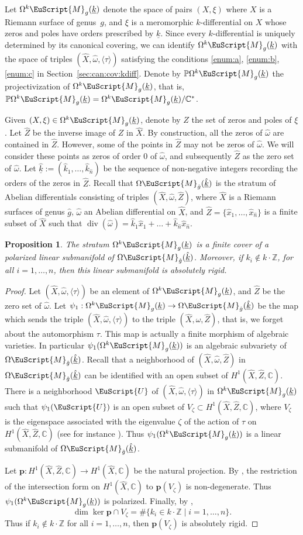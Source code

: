 \documentclass[10pt]{amsart}
\let\mathcal\EuScript
\DeclareMathOperator{\Div}{div}
\theoremstyle{plain}
\newtheorem{Proposition}[Theorem]{Proposition}
\theoremstyle{definition}
\def\C{\mathbb{C}}
\newcommand\Z{\mathbb{Z}}
\newcommand{\Pb}{\mathbb{P}}
\newcommand{\pp}{\boldsymbol{p}}
\newcommand{\Mcal}{\mathcal{M}}
\newcommand{\Ucal}{\mathcal{U}}
\newcommand{\hg}{\hat{g}}
\newcommand{\hn}{\hat{n}}
\newcommand{\hx}{\hat{x}}
\newcommand{\hX}{\hat{X}}
\newcommand{\hZ}{\hat{Z}}
\newcommand{\homg}{\hat{\omega}}
\newcommand{\hk}{\hat{k}}
\let\ul\underline
\newcommand{\Skdiff}{\Omega^k\mathcal{M}_{g}(\ul{k})}
\newcommand{\Sabel}{\Omega\Mcal_{\hat{g}}(\ul{\hat{k}})}
\newcommand{\pSkdiff}{\Pb\Omega^k\mathcal{M}_{g}(\ul{k})}
\begin{document}
Let $\Skdiff$ denote the space of pairs $(X,\xi)$ where $X$ is a Riemann surface of genus~$g$, and $\xi$ is a meromorphic $k$-differential on $X$ whose zeros and poles have orders prescribed by $\ul{k}$.
Since every $k$-differential is uniquely determined by its canonical covering, we can identify $\Skdiff$ with the space of triples $(\hX,\homg,\langle\tau\rangle)$ satisfying the conditions \eqref{enum:a}, \eqref{enum:b}, \eqref{enum:c} in Section~\ref{sec:can:cov:kdiff}.
Denote by $\pSkdiff$ the projectivization of $\Skdiff$, that is, $\pSkdiff=\Skdiff/\C^*$.

Given $(X,\xi)\in \Skdiff$, denote by $Z$ the set of zeros and poles of $\xi$. Let $\hZ$ be the inverse image of $Z$ in $\hX$. By construction, all the zeros of $\homg$ are contained in $\hZ$.
However, some of the points in $\hZ$ may not be zeros of $\homg$. We will consider these points as zeros of order $0$ of $\homg$, and subsequently $\hZ$ as the zero set of $\homg$.
Let $\ul{\hk}:=(\hk_1,\dots,\hk_{\hn})$ be the sequence of non-negative integers recording the orders of the zeros in $\hZ$.
Recall that $\Sabel$ is the stratum of Abelian differentials consisting of triples $(\hX,\homg,\hZ)$, where $\hX$ is a Riemann surfaces of genus $\hg$, $\homg$ an Abelian differential on $\hX$, and $\hZ=\{\hx_1,\dots,\hx_{\hn}\}$ is a finite subset of $\hX$ such that $\Div(\homg)=\hk_1\hx_1+\dots+\hk_{\hn}\hx_{\hn}$.

\begin{Proposition}\label{prop:kdiff:ln:man}
The stratum $\Skdiff$ is a finite cover of a polarized linear submanifold of $\Sabel$. Moreover, if $k_i\not\in k\cdot\Z$, for all $i=1,\dots,n$, then this linear submanifold is absolutely rigid.
\end{Proposition}
\begin{proof}
Let $(\hX,\homg,\langle\tau\rangle)$ be an element of $\Skdiff$, and $\hZ$ be the zero set of $\homg$. Let $\psi_1: \Skdiff \to \Sabel$ be the map which sends the triple $(\hX,\homg,\langle \tau \rangle)$ to the triple $(\hX,\homg,\hZ)$, that is, we forget about the automorphism $\tau$. This map is actually a finite morphism of algebraic varieties. In particular $\psi_1(\Skdiff)$ is an algebraic subvariety of $\Sabel$.
Recall that a neighborhood of $(\hX,\homg,\hZ)$ in $\Sabel$ can be identified with an open subset of $H^1(\hX,\hZ,\C)$.
There is a neighborhood $\Ucal$ of $(\hX,\homg,\langle\tau\rangle)$ in $\Skdiff$ such that $\psi_1(\Ucal)$ is an open subset of $V_\zeta \subset H^1(\hX,\hZ,\C)$, where $V_\zeta$ is the eigenspace associated with the eigenvalue $\zeta$ of the action of $\tau$ on $H^1(\hX,\hZ,\C)$ (see for instance \cite{BCGGM:kdiff, Ngu19}). Thus $\psi_1(\Skdiff)$ is a linear submanifold of $\Sabel$.

Let $\pp: H^1(\hX,\hZ,\C) \to H^1(\hX,\C)$ be the natural projection. By \cite[Prop.\,5.1]{Ngu19}, the restriction of the intersection form on $H^1(\hX,\C)$ to $\pp(V_\zeta)$ is non-degenerate. Thus $\psi_1(\Skdiff)$ is polarized. Finally, by \cite[Prop.\,4.1]{Ngu19},
\[
\dim \ker\pp\cap V_\zeta = \#\{k_i\in k\cdot\Z\mid i=1,\dots,n\}.
\]
Thus if $k_i\not\in k\cdot\Z$ for all $i=1,\dots,n$, then $\pp(V_\zeta)$ is absolutely rigid.
\end{proof}
\end{document}
